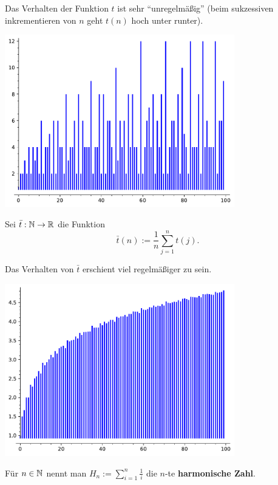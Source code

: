 \begin{bem}
	Das Verhalten der Funktion $t$ ist sehr ``unregelmäßig'' (beim sukzessiven inkrementieren von $n$ geht $t(n)$ hoch unter runter).  
	\begin{center}
			\includegraphics[width=10cm]{Pics/t_plot.pdf}
	\end{center} 
\end{bem}

\begin{defn}
	Sei $\bar{t} : \mathbb{N} \to \mathbb{R}$ die Funktion
	\[
			\bar{t} (n) := \frac{1}{n} \sum_{j=1}^n t(j).
	\]
\end{defn} 

\begin{bem}
	Das Verhalten von $\bar{t}$ erschient viel regelmäßiger zu sein. 
	\begin{center}
	\includegraphics[width=10cm]{Pics/t_bar_plot.pdf}
\end{center} 
\end{bem} 

\begin{defn}
	Für $n \in \mathbb{N}$ nennt man $H_n := \sum_{i=1}^n \frac{1}{i}$ die $n$-te \textbf{harmonische Zahl}. 
\end{defn} 

